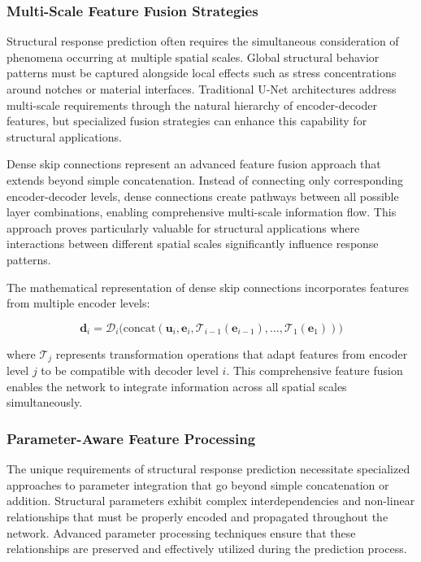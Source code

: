 \documentclass[12pt,a4paper]{report}
\begin{document}
\subsubsection*{Multi-Scale Feature Fusion Strategies}

Structural response prediction often requires the simultaneous consideration of phenomena occurring at multiple spatial scales. Global structural behavior patterns must be captured alongside local effects such as stress concentrations around notches or material interfaces. Traditional U-Net architectures address multi-scale requirements through the natural hierarchy of encoder-decoder features, but specialized fusion strategies can enhance this capability for structural applications.

Dense skip connections represent an advanced feature fusion approach that extends beyond simple concatenation. Instead of connecting only corresponding encoder-decoder levels, dense connections create pathways between all possible layer combinations, enabling comprehensive multi-scale information flow. This approach proves particularly valuable for structural applications where interactions between different spatial scales significantly influence response patterns.

The mathematical representation of dense skip connections incorporates features from multiple encoder levels:

\begin{equation}
\mathbf{d}_i = \mathcal{D}_i\big(\text{concat}(\mathbf{u}_i, \mathbf{e}_i, \mathcal{T}_{i-1}(\mathbf{e}_{i-1}), \ldots, \mathcal{T}_1(\mathbf{e}_1))\big)
\end{equation}

where $\mathcal{T}_j$ represents transformation operations that adapt features from encoder level $j$ to be compatible with decoder level $i$. This comprehensive feature fusion enables the network to integrate information across all spatial scales simultaneously.

\subsubsection*{Parameter-Aware Feature Processing}

The unique requirements of structural response prediction necessitate specialized approaches to parameter integration that go beyond simple concatenation or addition. Structural parameters exhibit complex interdependencies and non-linear relationships that must be properly encoded and propagated throughout the network. Advanced parameter processing techniques ensure that these relationships are preserved and effectively utilized during the prediction process.
\end{document}
